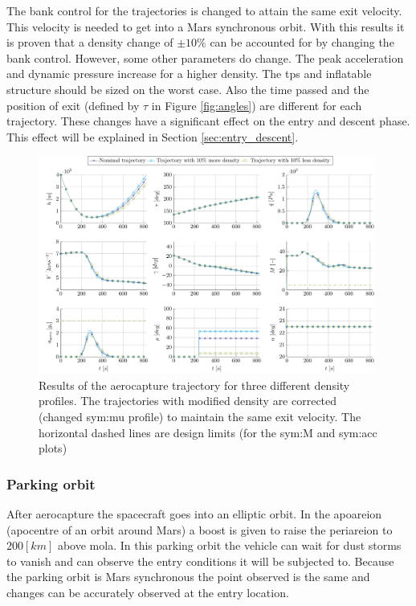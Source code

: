 The bank control for the trajectories is changed to attain the same exit velocity. This velocity is needed to get into a Mars synchronous orbit. With this results it is proven that a density change of $\pm 10\%$ can be accounted for by changing the bank control. However, some other parameters do change. The peak acceleration and dynamic pressure increase for a higher density. The \gls{tps} and inflatable structure should be sized on the worst case. Also the time passed and the position of exit (defined by $\tau$ in Figure \ref{fig:angles}) are different for each trajectory. These changes have a significant effect on the entry and descent phase. This effect will be explained in Section \ref{sec:entry_descent}.
\begin{figure}
	\centering
	\includegraphics[width=0.99\textwidth]{Figure/Orbit/sensitivity_aerocapture.pdf}
	\caption[Results of the aerocapture trajectory for three different density profiles]{Results of the aerocapture trajectory for three different density profiles. The trajectories with modified density are corrected (changed \gls{sym:mu} profile) to maintain the same exit velocity. The horizontal dashed lines are design limits (for the \gls{sym:M} and \gls{sym:acc} plots) }
	\label{fig:orbit_aerocapture_data}
\end{figure}

\subsubsection{Parking orbit}\label{sec:parking_orbit}
After aerocapture the spacecraft goes into an elliptic orbit. In the apoareion (apocentre of an orbit around Mars) a boost is given to raise the periareion to $200 \left[km\right]$ above \gls{mola}. In this parking orbit the vehicle can wait for dust storms to vanish and can observe the entry conditions it will be subjected to. Because the parking orbit is Mars synchronous the point observed is the same and changes can be accurately observed at the entry location. 

